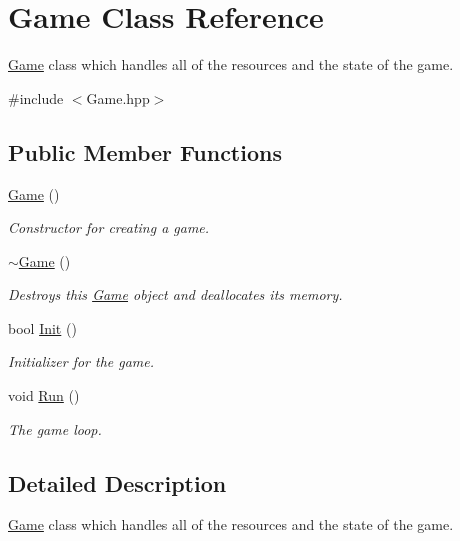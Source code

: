 \hypertarget{classGame}{}\section{Game Class Reference}
\label{classGame}


\hyperlink{classGame}{Game} class which handles all of the resources and the state of the game.  




{\ttfamily \#include $<$Game.\+hpp$>$}

\subsection*{Public Member Functions}
\begin{DoxyCompactItemize}
\item 
\mbox{\label{classGame_ad59df6562a58a614fda24622d3715b65}} 
\hyperlink{classGame_ad59df6562a58a614fda24622d3715b65}{Game} ()
\begin{DoxyCompactList}\small\item\em Constructor for creating a game. \end{DoxyCompactList}\item 
\mbox{\label{classGame_ae3d112ca6e0e55150d2fdbc704474530}} 
\hyperlink{classGame_ae3d112ca6e0e55150d2fdbc704474530}{$\sim$\+Game} ()
\begin{DoxyCompactList}\small\item\em Destroys this \hyperlink{classGame}{Game} object and deallocates its memory. \end{DoxyCompactList}\item 
bool \hyperlink{classGame_ab19596de871e7ce3ce5effc888c2a30b}{Init} ()
\begin{DoxyCompactList}\small\item\em Initializer for the game. \end{DoxyCompactList}\item 
void \hyperlink{classGame_a96341ca5b54d90adc3ecb3bf0bcd2312}{Run} ()
\begin{DoxyCompactList}\small\item\em The game loop. \end{DoxyCompactList}\end{DoxyCompactItemize}


\subsection{Detailed Description}
\hyperlink{classGame}{Game} class which handles all of the resources and the state of the game. 

